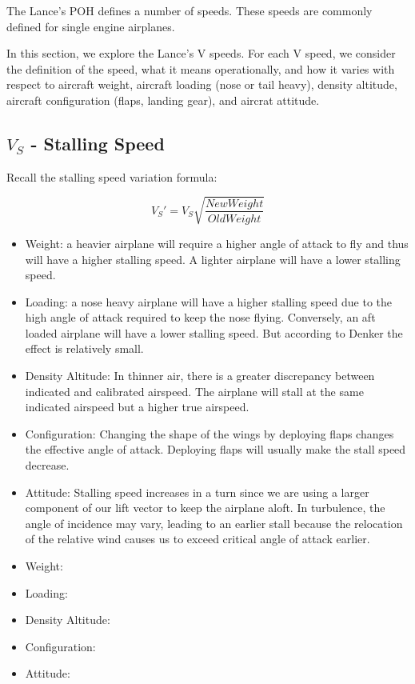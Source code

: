 The Lance's POH defines a number of speeds. These speeds are commonly defined for single engine airplanes.

In this section, we explore the Lance's V speeds. For each V speed, we consider the definition of the speed, what it means operationally, and how it varies with respect to aircraft weight, aircraft loading (nose or tail heavy), density altitude, aircraft configuration (flaps, landing gear), and aircrat attitude.

\subsection{$V_{S}$ - Stalling Speed}


Recall the stalling speed variation formula:

\begin{equation}
V_S' = V_S \sqrt{\frac{New Weight}{Old Weight}}
\end{equation}


\begin{itemize}
\item Weight: a heavier airplane will require a higher angle of attack to fly and thus will have a higher stalling speed. A lighter airplane will have a lower stalling speed.
\item Loading: a nose heavy airplane will have a higher stalling speed due to the high angle of attack required to keep the nose flying. Conversely, an aft loaded airplane will have a lower stalling speed. But according to Denker the effect is relatively small.
\item Density Altitude: In thinner air, there is a greater discrepancy between indicated and calibrated airspeed. The airplane will stall at the same indicated airspeed but a higher true airspeed.  
\item Configuration: Changing the shape of the wings by deploying flaps changes the effective angle of attack. Deploying flaps will usually make the stall speed decrease.
\item Attitude: Stalling speed increases in a turn since we are using a larger component of our lift vector to keep the airplane aloft. In turbulence, the angle of incidence may vary, leading to an earlier stall because the relocation of the relative wind causes us to exceed critical angle of attack earlier. 
\end{itemize}


\begin{itemize}
\item Weight:
\item Loading:
\item Density Altitude:
\item Configuration:
\item Attitude:
\end{itemize}




